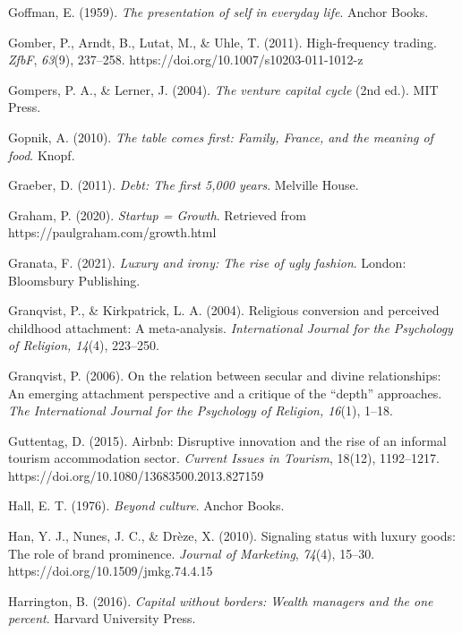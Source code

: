 \begin{thebibliography}{}
    Goffman, E. (1959). \textit{The presentation of self in everyday life}. Anchor Books.

    Gomber, P., Arndt, B., Lutat, M., \& Uhle, T. (2011). High-frequency trading. \textit{ZfbF}, \textit{63}(9), 237–258. https://doi.org/10.1007/s10203-011-1012-z

    Gompers, P. A., \& Lerner, J. (2004). \textit{The venture capital cycle} (2nd ed.). MIT Press.

    Gopnik, A. (2010). \textit{The table comes first: Family, France, and the meaning of food}. Knopf.

    Graeber, D. (2011). \textit{Debt: The first 5{,}000 years}. Melville House.

    Graham, P. (2020). \textit{Startup = Growth}. Retrieved from https://paulgraham.com/growth.html

    Granata, F. (2021). \textit{Luxury and irony: The rise of ugly fashion}. London: Bloomsbury Publishing.

    Granqvist, P., \& Kirkpatrick, L. A. (2004). Religious conversion and perceived childhood attachment: A meta-analysis. \textit{International Journal for the Psychology of Religion, 14}(4), 223–250.

    Granqvist, P. (2006). On the relation between secular and divine relationships: An emerging attachment perspective and a critique of the “depth” approaches. \textit{The International Journal for the Psychology of Religion, 16}(1), 1–18.

    Guttentag, D. (2015). Airbnb: Disruptive innovation and the rise of an informal tourism accommodation sector. \textit{Current Issues in Tourism}, 18(12), 1192–1217. https://doi.org/10.1080/13683500.2013.827159


    Hall, E. T. (1976). \textit{Beyond culture}. Anchor Books.

    Han, Y. J., Nunes, J. C., \& Drèze, X. (2010). Signaling status with luxury goods: The role of brand prominence. \textit{Journal of Marketing}, \textit{74}(4), 15--30. https://doi.org/10.1509/jmkg.74.4.15

    Harrington, B. (2016). \textit{Capital without borders: Wealth managers and the one percent}. Harvard University Press.


\end{thebibliography}
